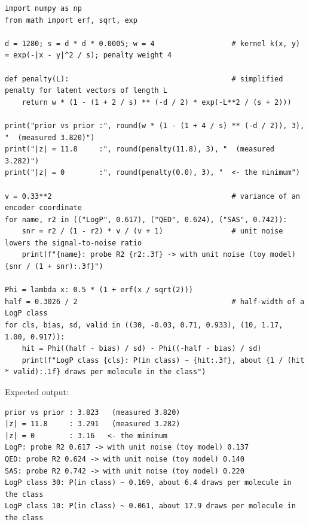 \documentclass[11pt]{article}
\begin{document}
\begin{lstlisting}
import numpy as np
from math import erf, sqrt, exp

d = 1280; s = d * d * 0.0005; w = 4                  # kernel k(x, y) = exp(-|x - y|^2 / s); penalty weight 4

def penalty(L):                                      # simplified penalty for latent vectors of length L
    return w * (1 - (1 + 2 / s) ** (-d / 2) * exp(-L**2 / (s + 2)))

print("prior vs prior :", round(w * (1 - (1 + 4 / s) ** (-d / 2)), 3), "  (measured 3.820)")
print("|z| = 11.8     :", round(penalty(11.8), 3), "  (measured 3.282)")
print("|z| = 0        :", round(penalty(0.0), 3), "  <- the minimum")

v = 0.33**2                                          # variance of an encoder coordinate
for name, r2 in (("LogP", 0.617), ("QED", 0.624), ("SAS", 0.742)):
    snr = r2 / (1 - r2) * v / (v + 1)                # unit noise lowers the signal-to-noise ratio
    print(f"{name}: probe R2 {r2:.3f} -> with unit noise (toy model) {snr / (1 + snr):.3f}")

Phi = lambda x: 0.5 * (1 + erf(x / sqrt(2)))
half = 0.3026 / 2                                    # half-width of a LogP class
for cls, bias, sd, valid in ((30, -0.03, 0.71, 0.933), (10, 1.17, 1.00, 0.917)):
    hit = Phi((half - bias) / sd) - Phi((-half - bias) / sd)
    print(f"LogP class {cls}: P(in class) ~ {hit:.3f}, about {1 / (hit * valid):.1f} draws per molecule in the class")
\end{lstlisting}

Expected output:
\begin{lstlisting}[language={},basicstyle=\ttfamily\small]
prior vs prior : 3.823   (measured 3.820)
|z| = 11.8     : 3.291   (measured 3.282)
|z| = 0        : 3.16   <- the minimum
LogP: probe R2 0.617 -> with unit noise (toy model) 0.137
QED: probe R2 0.624 -> with unit noise (toy model) 0.140
SAS: probe R2 0.742 -> with unit noise (toy model) 0.220
LogP class 30: P(in class) ~ 0.169, about 6.4 draws per molecule in the class
LogP class 10: P(in class) ~ 0.061, about 17.9 draws per molecule in the class
\end{lstlisting}
\end{document}
